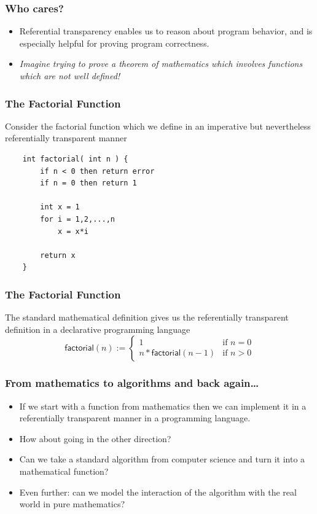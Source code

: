\documentclass[xcolor=pdftex,dvipsnames,table]{beamer}
\begin{document}
\begin{frame}
    \frametitle{Who cares?}
    \begin{itemize}
        \item Referential transparency enables us to reason about
            program behavior, and is especially helpful for proving
            program correctness. \pause
        \item \emph{Imagine trying to prove a theorem of mathematics
            which involves functions which are not well defined!}
    \end{itemize}
\end{frame}

\begin{frame}[fragile]
    \frametitle{The Factorial Function}
Consider the factorial function which we define in an imperative but
nevertheless referentially transparent manner
\begin{verbatim}
    int factorial( int n ) {
        if n < 0 then return error
        if n = 0 then return 1

        int x = 1
        for i = 1,2,...,n
            x = x*i

        return x
    }
\end{verbatim}
\end{frame}

\begin{frame}
    \frametitle{The Factorial Function}
    The standard mathematical definition gives us the referentially
    transparent definition in a declarative programming language
    \pause
    \begin{equation*}
     \mathsf{factorial}(n) := \begin{cases}
    1 & \text{if } n=0\\
    n*\mathsf{factorial}(n-1) & \text{if } n > 0
    \end{cases}
    \end{equation*}
\end{frame}

\begin{frame}
    \frametitle{From mathematics to algorithms and back again\ldots}
    \begin{itemize}
        \item If we start with a function from mathematics then we can
            implement it in a referentially transparent manner in a
            programming language. \pause
        \item How about going in the other direction? \pause
        \item Can we take a standard algorithm from computer science
            and turn it into a mathematical function? \pause
        \item Even further: can we model the interaction of the
            algorithm with the real world in pure mathematics?
    \end{itemize}
\end{frame}
\end{document}
